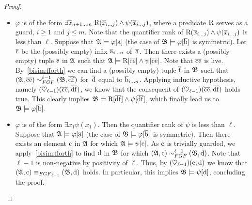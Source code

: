 \begin{proof}
\begin{itemize}
  \item $\varphi$ is of the form $\exists{\vartuplexfromto{n{+}1}{m}}\ \relR(\vartuplexfromto{i}{j}) \land \psi(\vartuplexfromto{i}{j})$, where a predicate $\mathrm{R}$ serves as a guard, $i \geq 1$ and $j \leq m$.
  Note that the quantifier rank of $\mathrm{R}(\overline{\mathit{x}}_{i\ldots j}) \land \psi(\overline{\mathit{x}}_{i\ldots j})$ is less than $\ell$.
  Suppose that ${\mathfrak{A}} \models \varphi[\overline{\mathrm{a}}]$ (the case of ${\mathfrak{B}} \models \varphi[\overline{\mathrm{b}}]$ is symmetric).
  Let $\overline{\mathrm{c}}$ be the (possibly empty) infix $\overline{\mathrm{a}}_{i\ldots n}$ of~$\overline{\mathrm{a}}$.
  Then there exists a (possibly empty) tuple $\overline{\mathrm{e}}$ in ${\mathfrak{A}}$ such that ${\mathfrak{A}} \models \mathrm{R}[\overline{\mathrm{c}}\overline{\mathrm{e}}] \land \psi[\overline{\mathrm{c}}\overline{\mathrm{e}}]$.
  Note that $\overline{\mathrm{c}}\overline{\mathrm{e}}$ is live.
  By~\ref{bisim:fforth} we can find a (possibly empty) tuple $\overline{\mathrm{f}}$ in ${\mathfrak{B}}$ such that $(\str{A}, \elemtuplec\elemtuplee) \bisimto_{\FGF}^{\ell{-}1} (\str{B}, \elemtupled\elemtuplef)$ for~$\overline{\mathrm{d}}$ equal to $\overline{\mathrm{b}}_{i\ldots n}$.
  Applying inductive hypothesis, namely $(\heartsuit_{\ell{-}1})(\overline{\mathrm{c}}\overline{\mathrm{e}},\overline{\mathrm{d}}\overline{\mathrm{f}})$, we know that the consequent of $(\heartsuit_{\ell{-}1})(\overline{\mathrm{c}}\overline{\mathrm{e}},\overline{\mathrm{d}}\overline{\mathrm{f}})$ holds true.
  This clearly implies ${\mathfrak{B}} \models \mathrm{R}[\overline{\mathrm{d}}\overline{\mathrm{f}}] \land \psi[\overline{\mathrm{d}}\overline{\mathrm{f}}]$, which finally lead us to ${\mathfrak{B}} \models \varphi[\overline{\mathrm{b}}]$.

  \item $\varphi$ is of the form $\exists{x_{1}} \psi(x_1)$. Then the quantifier rank of $\psi$ is less than $\ell$.
  Suppose that ${\mathfrak{A}} \models \varphi[\overline{\mathrm{a}}]$ (the case of ${\mathfrak{B}} \models \varphi[\overline{\mathrm{b}}]$ is symmetric).
  Then there exists an element $\mathrm{c}$ in ${\mathfrak{A}}$ for which ${\mathfrak{A}} \models \psi[\mathrm{c}]$.
  As $\mathrm{c}$ is trivially guarded, we apply~\ref{bisim:fforth} to find $\mathrm{d}$ in ${\mathfrak{B}}$ for which $(\str{A}, \elem{c}) \bisimto_{\FGF}^{\ell{-}1} (\str{B}, \elem{d})$.
  Note that $\ell{-}1$ is non-negative by positivity of $\ell$.
  Thus, by $(\heartsuit_{\ell{-}1})(\mathrm{c},\mathrm{d})$ we know that $(\str{A}, \elem{c}) \equiv_{\FGF_{\ell{-}1}} (\str{B}, \elem{d})$ holds.
  In particular, this implies ${\mathfrak{B}} \models \psi[\mathrm{d}]$, concluding the proof.
\end{itemize}


\end{proof}
